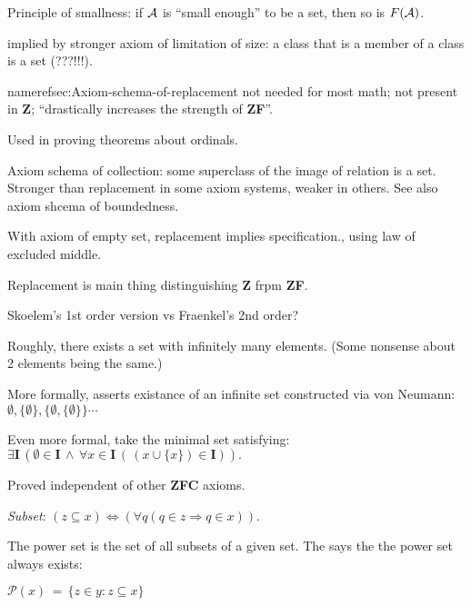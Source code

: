 Principle of smallness: if $\mathcal{A}$ is 
``small enough'' to be a set,
then so is $F(\mathcal{A})$.

 implied by stronger
axiom of limitation of 
size\cite{wiki:Axiom_of_limitation_of_size}:
a class that is a member of a class is a set (???!!!).

nameref{sec:Axiom-schema-of-replacement} not needed for most math;
not present in \textbf{Z};
``drastically increases the strength of \textbf{ZF}''.

Used in proving theorems about ordinals.

Axiom schema of collection: some superclass of 
the image of relation is a set.
Stronger than replacement
in some axiom systems, weaker in others.
See also axiom shcema of boundedness.

With axiom of empty set, replacement implies specification.,
using law of excluded middle.

Replacement is main thing distinguishing \textbf{Z}
frpm \textbf{ZF}.

Skoelem's 1st order version vs Fraenkel's 2nd order?
\label{sec:Axiom-of-infinity}

Roughly, there exists a set with infinitely many 
elements\cite{wiki:Axiom_of_infinity}.
(Some nonsense about 2 elements being the same.)

More formally, asserts existance of an infinite set 
constructed via von Neumann:
$\emptyset, \{\emptyset\}, \{ \emptyset, \{\emptyset\} \} \cdots$

Even more formal, take the minimal set satisfying:
${\displaystyle 
\exists \mathbf {I}
 \,(\emptyset \in \mathbf {I}
 \,\land \,
 \forall x\in \mathbf {I} \,
 (\,(x\cup \{x\})\in \mathbf {I} )).}$
 
 Proved independent of other \textbf{ZFC} axioms.
 
 
\label{sec:Axiom-of-power-set}

\textsl{Subset}:
$(z\subseteq x)
 \Leftrightarrow 
 (\forall q(q\in z\Rightarrow q\in x)).$
 
The power set is the set of all subsets of a given set.
The  says the the power set
always exists\cite{wiki:Axiom_of_power_set}:

${\displaystyle {\mathcal{P}}(x) \,=\, \{z\in y:z\subseteq x\}}$

